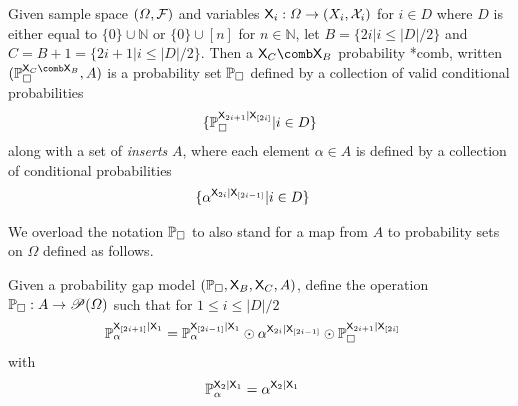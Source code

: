 
\begin{definition}\label{def:order1_bycond}
Given sample space $(\Omega,\mathcal{F})$ and variables $\mathsf{X}_{i}:\Omega\to (X_i,\mathcal{X}_i)$ for $i\in D$ where $D$ is either equal to $\{0\}\cup\mathbb{N}$ or $\{0\}\cup[n]$ for $n\in \mathbb{N}$, let $B=\{2i|i\leq |D|/2\}$ and $C=B+1=\{2i+1|i\leq |D|/2\}$. Then a $\RV{X}_C\comb\RV{X}_B$ probability *comb, written $(\prob{P}_\square^{\RV{X}_C\comb \RV{X}_B},A)$ is a probability set $\mathbb{P}_\square$ defined by a collection of valid conditional probabilities 
\begin{align}
	\{\mathbb{P}_\square^{\mathsf{X}_{2i+1}|\mathsf{X}_{[2i]}}|i\in D\}
\end{align}
along with a set of \emph{inserts} $A$, where each element $\alpha\in A$ is defined by a collection of conditional probabilities
\begin{align}
	&\{\alpha^{\mathsf{X}_{2i}|\mathsf{X}_{[2i-1]}}|i\in D\}
\end{align}
\end{definition}

We overload the notation $\mathbb{P}_\square$ to also stand for a map from $A$ to probability sets on $\Omega$ defined as follows.

\begin{definition}
Given a probability gap model $(\mathbb{P}_\square,\mathsf{X}_B,\mathsf{X}_C,A)$, define the operation $\mathbb{P}_\square:A\to \mathscr{P}(\Omega)$ such that for $1\leq i\leq |D|/2$ 
\begin{align}
	\mathbb{P}_\alpha^{\mathsf{X}_{[2i+1]}|\mathsf{X}_1} &= \mathbb{P}_\alpha^{\mathsf{X}_{[2i-1]}|\mathsf{X}_1}\odot \alpha^{\mathsf{X}_{2i}|\mathsf{X}_{[2i-1]}}\odot\mathbb{P}_{\square}^{\mathsf{X}_{2i+1}|\mathsf{X}_{[2i]}}
\end{align}
with
\begin{align}
	\mathbb{P}_\alpha^{\mathsf{X}_{2}|\mathsf{X}_1} &= \alpha^{\mathsf{X}_{2}|\mathsf{X}_{1}}
\end{align}
\end{definition}

